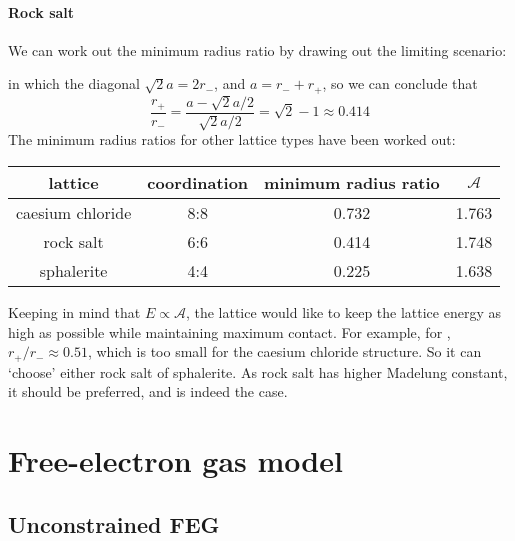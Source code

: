 \paragraph{Rock salt} 
We can work out the minimum radius ratio by drawing out the limiting scenario:
\begin{center}
\end{center}
in which the diagonal $\sqrt{2}a=2r_-$, and $a=r_-+r_+$, so we can conclude that
\begin{equation}
	\frac{r_+}{r_-}=\frac{a-\sqrt{2}a/2}{\sqrt{2}a/2}=\sqrt{2}-1\approx0.414
\end{equation}
The minimum radius ratios for other lattice types have been worked out:
\begin{center}
	\begin{tabular}{cccc}
	\hline
	lattice  & coordination & minimum radius ratio &$\mathcal{A}$\\
	\hline
	caesium chloride & 8:8 & 0.732 & 1.763\\
	rock salt & 6:6 & 0.414 & 1.748\\
	sphalerite & 4:4 & 0.225 & 1.638\\
	\hline
	\end{tabular}
\end{center}
Keeping in mind that $E\propto\mathcal{A}$, the lattice would like to keep the lattice energy as high as possible while maintaining maximum contact. For example, for , $r_+/r_-\approx0.51$, which is too small for the caesium chloride structure. So it can `choose' either rock salt of sphalerite. As rock salt has higher Madelung constant, it should be preferred, and is indeed the case.
\section{Free-electron gas model}
\subsection{Unconstrained FEG}
